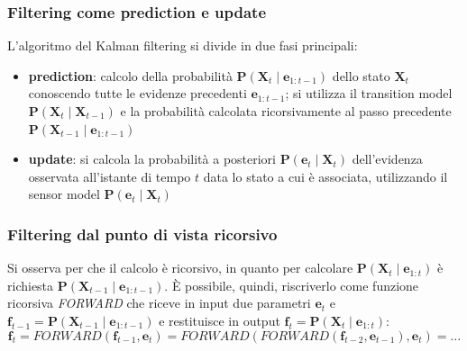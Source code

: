 \subsubsection*{Filtering come prediction e update}
L'algoritmo del Kalman filtering si divide in due fasi principali:
\begin{itemize}
	\item \textbf{prediction}: calcolo della probabilità \(\textbf{P}(\textbf{X}_t \mid \textbf{e}_{1:t-1})\) dello stato
	\(\textbf{X}_t\) conoscendo tutte le evidenze precedenti \(\textbf{e}_{1:t-1}\); si utilizza il transition model
	\(\textbf{P}(\textbf{X}_t \mid \textbf{X}_{t-1})\) e la probabilità calcolata ricorsivamente al passo precedente
	\(\textbf{P}(\textbf{X}_{t-1} \mid \textbf{e}_{1:t-1})\)
	\item \textbf{update}: si calcola la probabilità a posteriori \(\textbf{P}(\textbf{e}_t \mid \textbf{X}_{t})\)
	dell'evidenza osservata all'istante di tempo \(t\) data lo stato a cui è associata, utilizzando il sensor model
	\(\textbf{P}(\textbf{e}_t \mid \textbf{X}_t)\)
\end{itemize}

\subsubsection*{Filtering dal punto di vista ricorsivo}
Si osserva per che il calcolo è ricorsivo, in quanto per calcolare \(\textbf{P}(\textbf{X}_t \mid \textbf{e}_{1:t})\)
è richiesta \(\textbf{P}(\textbf{X}_{t-1} \mid \textbf{e}_{1:t-1})\). È possibile, quindi, riscriverlo come funzione ricorsiva
\textit{FORWARD} che riceve in input due parametri \(\textbf{e}_t\) e \(\textbf{f}_{t-1} = \textbf{P}(\textbf{X}_{t-1} \mid \textbf{e}_{1:t-1})\)
e restituisce in output \(\textbf{f}_t = \textbf{P}(\textbf{X}_t \mid \textbf{e}_{1:t})\):
\[\textbf{f}_{t} = \textit{FORWARD}(\textbf{f}_{t-1}, \textbf{e}_t) = \textit{FORWARD}(\textit{FORWARD}(\textbf{f}_{t-2}, \textbf{e}_{t-1}), \textbf{e}_t) = \dots\]

\newpage

